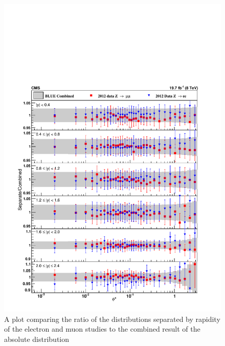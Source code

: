 \begin{figure}
    \centering
    \includegraphics[width=\linewidth]{figures/Results/BlueTwoDAbs.pdf}
    \caption{A plot comparing the ratio of the \phistar distributions separated by rapidity of the electron and muon studies to the \BLUE combined result of the absolute distribution}
    \label{fig:BlueTwoDAbs}
\end{figure}

